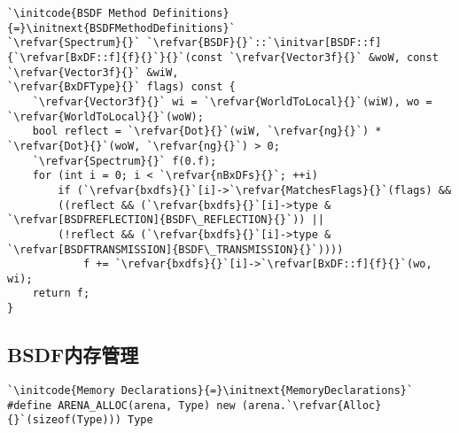 \begin{lstlisting}
`\initcode{BSDF Method Definitions}{=}\initnext{BSDFMethodDefinitions}`
`\refvar{Spectrum}{}` `\refvar{BSDF}{}`::`\initvar[BSDF::f]{`\refvar[BxDF::f]{f}{}`}{}`(const `\refvar{Vector3f}{}` &woW, const `\refvar{Vector3f}{}` &wiW,
`\refvar{BxDFType}{}` flags) const {
    `\refvar{Vector3f}{}` wi = `\refvar{WorldToLocal}{}`(wiW), wo = `\refvar{WorldToLocal}{}`(woW);
    bool reflect = `\refvar{Dot}{}`(wiW, `\refvar{ng}{}`) * `\refvar{Dot}{}`(woW, `\refvar{ng}{}`) > 0;
    `\refvar{Spectrum}{}` f(0.f);
    for (int i = 0; i < `\refvar{nBxDFs}{}`; ++i)
        if (`\refvar{bxdfs}{}`[i]->`\refvar{MatchesFlags}{}`(flags) &&
        ((reflect && (`\refvar{bxdfs}{}`[i]->type & `\refvar[BSDFREFLECTION]{BSDF\_REFLECTION}{}`)) ||
        (!reflect && (`\refvar{bxdfs}{}`[i]->type & `\refvar[BSDFTRANSMISSION]{BSDF\_TRANSMISSION}{}`))))
            f += `\refvar{bxdfs}{}`[i]->`\refvar[BxDF::f]{f}{}`(wo, wi);
    return f;
}
\end{lstlisting}

\subsection{BSDF内存管理}\label{sub:BSDF内存管理}
\begin{lstlisting}
`\initcode{Memory Declarations}{=}\initnext{MemoryDeclarations}`
#define ARENA_ALLOC(arena, Type) new (arena.`\refvar{Alloc}{}`(sizeof(Type))) Type
\end{lstlisting}